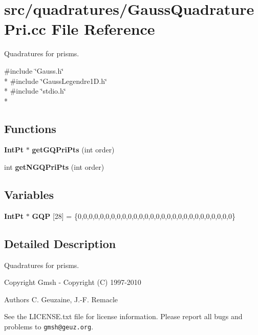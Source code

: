 \section{src/quadratures/\-Gauss\-Quadrature\-Pri.cc File Reference}
\label{GaussQuadraturePri_8cc}


Quadratures for prisms.  


{\ttfamily \#include \char`\"{}Gauss.\-h\char`\"{}}\\*
{\ttfamily \#include \char`\"{}Gauss\-Legendre1\-D.\-h\char`\"{}}\\*
{\ttfamily \#include \char`\"{}stdio.\-h\char`\"{}}\\*
\subsection*{Functions}
\begin{DoxyCompactItemize}
\item 
{\bf Int\-Pt} $\ast$ {\bfseries get\-G\-Q\-Pri\-Pts} (int order)\label{GaussQuadraturePri_8cc_abfeb9015e14445ae6346670056eec63b}

\item 
int {\bfseries get\-N\-G\-Q\-Pri\-Pts} (int order)\label{GaussQuadraturePri_8cc_abcf4058db693ed39dc76b31e0c2946a6}

\end{DoxyCompactItemize}
\subsection*{Variables}
\begin{DoxyCompactItemize}
\item 
{\bf Int\-Pt} $\ast$ {\bfseries G\-Q\-P} [28] = \{0,0,0,0,0,0,0,0,0,0,0,0,0,0,0,0,0,0,0,0,0,0,0,0,0,0,0,0\}\label{GaussQuadraturePri_8cc_afea74fda9db30971b562d321b9dbb472}

\end{DoxyCompactItemize}


\subsection{Detailed Description}
Quadratures for prisms. \begin{DoxyCopyright}{Copyright}
Gmsh -\/ Copyright (C) 1997-\/2010 
\end{DoxyCopyright}
\begin{DoxyAuthor}{Authors}
C. Geuzaine, J.-\/\-F. Remacle
\end{DoxyAuthor}
See the L\-I\-C\-E\-N\-S\-E.\-txt file for license information. Please report all bugs and problems to {\tt gmsh@geuz.\-org}. 